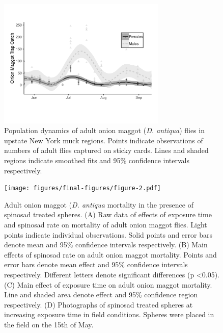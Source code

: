 \documentclass[alpha-refs]{wiley-article}
\begin{document}
\begin{figure}[bt]
\centering
\includegraphics[width = 8cm]{figures/final-figures/figure-1.pdf}
\caption{Population dynamics of adult onion maggot (\textit{D. antiqua}) flies in upstate New York muck regions.  Points indicate observations of numbers of adult flies captured on sticky cards.  Lines and shaded regions indicate smoothed fits and 95\% confidence intervals respectively.  }
\label{fig:figure1}
\end{figure}

\begin{figure}[bt]
\centering
\texttt{[image: figures/final-figures/figure-2.pdf]}
\caption{Adult onion maggot (\textit{D. antiqua} mortality in the presence of spinosad treated spheres.  (A) Raw data of effects of exposure time and spinosad rate on mortality of adult onion maggot flies.  Light points indicate individual observations.  Solid points and error bars denote mean and 95\% confidence intervals respectively.  (B) Main effects of spinosad rate on adult onion maggot mortality.  Points and error bars denote mean effect and 95\% confidence intervals respectively.  Different letters denote significant differences (p \textless 0.05).  (C) Main effect of exposure time on adult onion maggot mortality.  Line and shaded area denote effect and 95\% confidence region respectively.  (D) Photographs of spinosad treated spheres at increasing exposure time in field conditions.  Spheres were placed in the field on the 15th of May.  }
\label{fig:figure2}
\end{figure}
\end{document}
